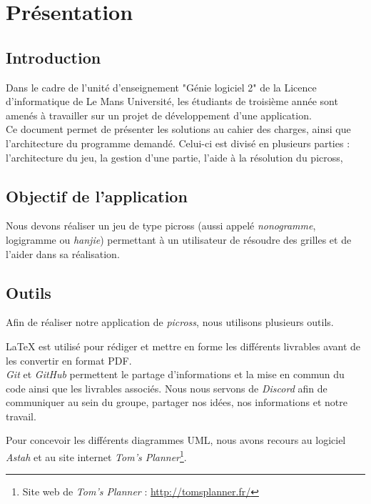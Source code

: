 \documentclass{report}
\begin{document}
\renewcommand{\contentsname}{Sommaire}
\tableofcontents


\chapter{Présentation}

	\section{Introduction}

		Dans le cadre de l'unité d'enseignement "Génie logiciel 2" de la Licence d'informatique de Le Mans Université, les étudiants de troisième année sont amenés à travailler sur un projet de développement d'une application. \\
		Ce document permet de présenter les solutions au cahier des charges, ainsi que l'architecture du programme demandé. Celui-ci est divisé en plusieurs parties : l’architecture du jeu, la gestion d'une partie, l'aide à la résolution du picross, %

	
 	\section{Objectif de l'application}		
		Nous devons réaliser un jeu de type picross (aussi appelé \textit{nonogramme}, logigramme ou \textit{hanjie}) permettant à un utilisateur de résoudre des grilles et de l'aider dans sa réalisation.
		
	\section{Outils}
		
		Afin de réaliser notre application de \textit{picross}, nous utilisons plusieurs outils.
		
	LaTeX est utilisé pour rédiger et mettre en forme les différents livrables avant de les convertir en format PDF. \\
\textit{Git} et \textit{GitHub} permettent le partage d'informations et la mise en commun du code ainsi que les livrables associés. Nous nous servons de \textit{Discord} afin de communiquer au sein du groupe, partager nos idées, nos informations et notre travail.

	Pour concevoir les différents diagrammes UML, nous avons recours au logiciel \textit{Astah} et au site internet \textit{Tom's Planner}\footnote{Site web de \textit{Tom's Planner} : \url{http://tomsplanner.fr/}}.
\end{document}
